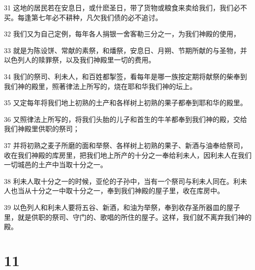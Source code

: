 \par 31 这地的居民若在安息日，或什麽圣日，带了货物或粮食来卖给我们，我们必不买。每逢第七年必不耕种，凡欠我们债的必不追讨。
\par 32 我们又为自己定例，每年各人捐银一舍客勒三分之一，为我们神殿的使用，
\par 33 就是为陈设饼、常献的素祭，和燔祭，安息日、月朔、节期所献的与圣物，并以色列人的赎罪祭，以及我们神殿里一切的费用。
\par 34 我们的祭司、利未人，和百姓都掣签，看每年是哪一族按定期将献祭的柴奉到我们神的殿里，照著律法上所写的，烧在耶和华我们神的坛上。
\par 35 又定每年将我们地上初熟的土产和各样树上初熟的果子都奉到耶和华的殿里。
\par 36 又照律法上所写的，将我们头胎的儿子和首生的牛羊都奉到我们神的殿，交给我们神殿里供职的祭司；
\par 37 并将初熟之麦子所磨的面和举祭、各样树上初熟的果子、新酒与油奉给祭司，收在我们神殿的库房里，把我们地上所产的十分之一奉给利未人，因利未人在我们一切城邑的土产中当取十分之一。
\par 38 利未人取十分之一的时候，亚伦的子孙中，当有一个祭司与利未人同在。利未人也当从十分之一中取十分之一，奉到我们神殿的屋子里，收在库房中。
\par 39 以色列人和利未人要将五谷、新酒，和油为举祭，奉到收存圣所器皿的屋子里，就是供职的祭司、守门的、歌唱的所住的屋子。这样，我们就不离弃我们神的殿。

\chapter{11}

